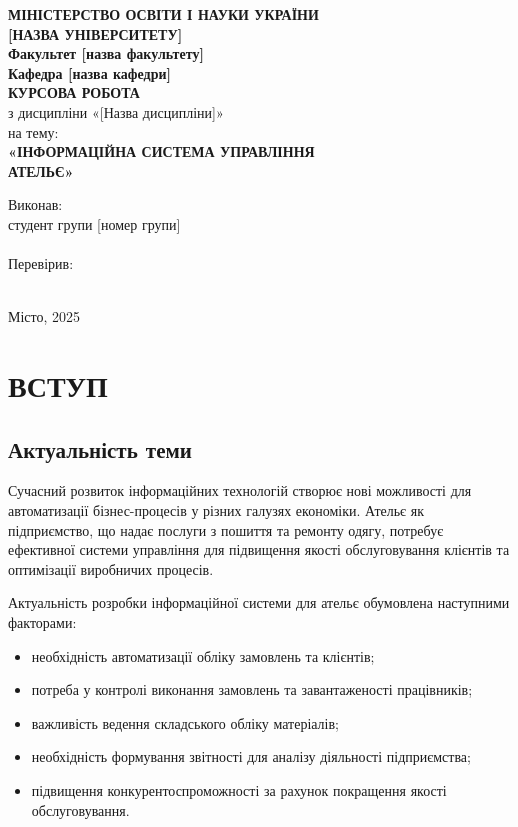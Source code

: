 \documentclass[14pt,a4paper]{extarticle}
\begin{document}
\begin{titlepage}
\centering
\textbf{МІНІСТЕРСТВО ОСВІТИ І НАУКИ УКРАЇНИ}\\
\textbf{[НАЗВА УНІВЕРСИТЕТУ]}\\[0.5cm]
\textbf{Факультет [назва факультету]}\\
\textbf{Кафедра [назва кафедри]}\\[3cm]

{\Large\textbf{КУРСОВА РОБОТА}}\\[0.5cm]
з дисципліни «[Назва дисципліни]»\\[0.5cm]
на тему:\\[0.5cm]
{\Large\textbf{«ІНФОРМАЦІЙНА СИСТЕМА УПРАВЛІННЯ\\АТЕЛЬЄ»}}\\[3cm]

\begin{flushright}
Виконав:\\
студент групи [номер групи]\\
[ПІБ студента]\\[1cm]
Перевірив:\\
[ПІБ викладача]\\
[посада, науковий ступінь]
\end{flushright}

\vfill

Місто, 2025
\end{titlepage}

\newpage
\tableofcontents
\newpage

\section{ВСТУП}

\subsection{Актуальність теми}

Сучасний розвиток інформаційних технологій створює нові можливості для автоматизації бізнес-процесів у різних галузях економіки. Ательє як підприємство, що надає послуги з пошиття та ремонту одягу, потребує ефективної системи управління для підвищення якості обслуговування клієнтів та оптимізації виробничих процесів.

Актуальність розробки інформаційної системи для ательє обумовлена наступними факторами:
\begin{itemize}
    \item необхідність автоматизації обліку замовлень та клієнтів;
    \item потреба у контролі виконання замовлень та завантаженості працівників;
    \item важливість ведення складського обліку матеріалів;
    \item необхідність формування звітності для аналізу діяльності підприємства;
    \item підвищення конкурентоспроможності за рахунок покращення якості обслуговування.
\end{itemize}
\end{document}
